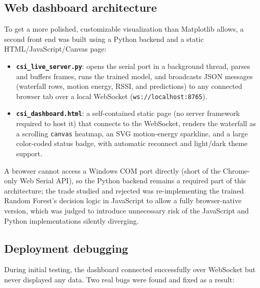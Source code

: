 \documentclass[11pt,a4paper]{article}
\begin{document}
\subsection{Web dashboard architecture}

To get a more polished, customizable visualization than Matplotlib
allows, a second front end was built using a Python backend and a
static HTML/JavaScript/Canvas page:

\begin{itemize}
    \item \textbf{\texttt{csi\_live\_server.py}}: opens the serial port
    in a background thread, parses and buffers frames, runs the trained
    model, and broadcasts JSON messages (waterfall rows, motion energy,
    RSSI, and predictions) to any connected browser tab over a local
    WebSocket (\texttt{ws://localhost:8765}).
    \item \textbf{\texttt{csi\_dashboard.html}}: a self-contained static
    page (no server framework required to host it) that connects to the
    WebSocket, renders the waterfall as a scrolling \texttt{canvas}
    heatmap, an SVG motion-energy sparkline, and a large color-coded
    status badge, with automatic reconnect and light/dark theme support.
\end{itemize}

A browser cannot access a Windows COM port directly (short of the
Chrome-only Web Serial API), so the Python backend remains a required
part of this architecture; the trade studied and rejected was
re-implementing the trained Random Forest's decision logic in
JavaScript to allow a fully browser-native version, which was judged to
introduce unnecessary risk of the JavaScript and Python implementations
silently diverging.

\subsection{Deployment debugging}

During initial testing, the dashboard connected successfully over
WebSocket but never displayed any data. Two real bugs were found and
fixed as a result:
\end{document}
